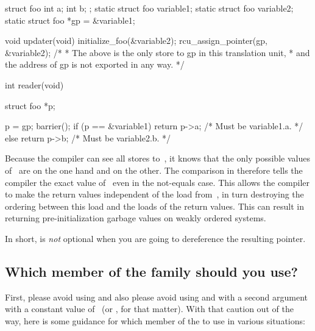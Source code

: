 \begin{VerbatimU}[samepage=false]
	struct foo {
		int a;
		int b;
	};
	static struct foo variable1;
	static struct foo variable2;
	static struct foo *gp = &variable1;

	void updater(void)
	{
		initialize_foo(&variable2);
		rcu_assign_pointer(gp, &variable2);
		/*
		 * The above is the only store to gp in this translation unit,
		 * and the address of gp is not exported in any way.
		 */
	}

	int reader(void)
	{
		struct foo *p;

		p = gp;
		barrier();
		if (p == &variable1)
			return p->a; /* Must be variable1.a. */
		else
			return p->b; /* Must be variable2.b. */
	}
\end{VerbatimU}

Because the compiler can see all stores to~, it knows that the only
possible values of~ are  on the one hand and 
on the other.
The comparison in  therefore tells the compiler
the exact value of~ even in the not-equals case.
This allows the
compiler to make the return values independent of the load from~,
in turn destroying the ordering between this load and the loads of the
return values.
This can result in  returning pre-initialization
garbage values on weakly ordered systems.

In short,  is \emph{not} optional when you are going to
dereference the resulting pointer.


\subsection{Which member of the  family should you use?}
\label{sec:rcu:Which member of the rcu_dereference() family should you use?}

First, please avoid using  and also please avoid
using  and  with a
second argument with a constant value of~ (or , for that matter).
With that caution out of the way, here is some guidance for which
member of the  to use in various situations:

